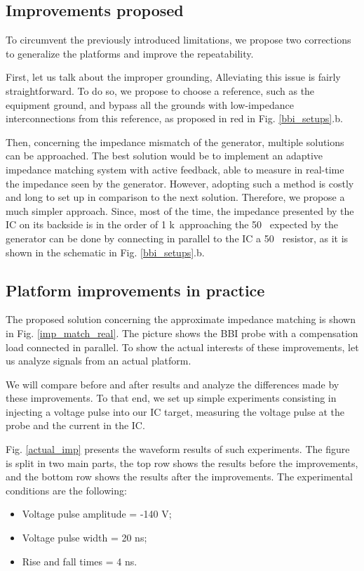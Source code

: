 	\subsection{Improvements proposed}
		To circumvent the previously introduced limitations, we propose two corrections to generalize the platforms and improve the repeatability.

		First, let us talk about the improper grounding,
		Alleviating this issue is fairly straightforward.
		To do so, we propose to choose a reference, such as the equipment ground, and bypass all the grounds with low-impedance interconnections from this reference, as proposed in red in Fig. \ref{bbi_setups}.b.

		Then, concerning the impedance mismatch of the generator, multiple solutions can be approached.
		The best solution would be to implement an adaptive impedance matching system with active feedback, able to measure in real-time the impedance seen by the generator.
		However, adopting such a method is costly and long to set up in comparison to the next solution.
		Therefore, we propose a much simpler approach.
		Since, most of the time, the impedance presented by the IC on its backside is in the order of 1 k\textOmega\, approaching the 50 \textOmega\ expected by the generator can be done by connecting in parallel to the IC a 50 \textOmega\ resistor, as it is shown in the schematic in Fig. \ref{bbi_setups}.b.

	\subsection{Platform improvements in practice}
		
		The proposed solution concerning the approximate impedance matching is shown in Fig. \ref{imp_match_real}.
		The picture shows the BBI probe with a compensation load connected in parallel.
		To show the actual interests of these improvements, let us analyze signals from an actual platform.

		We will compare before and after results and analyze the differences made by these improvements.
		To that end, we set up simple experiments consisting in injecting a voltage pulse into our IC target, measuring the voltage pulse at the probe and the current in the IC.
		
		Fig. \ref{actual_imp} presents the waveform results of such experiments.
		The figure is split in two main parts, the top row shows the results before the improvements, and the bottom row shows the results after the improvements.
		The experimental conditions are the following:
		\begin{itemize}
			\item Voltage pulse amplitude = -140 V;
			\item Voltage pulse width = 20 ns;
			\item Rise and fall times = 4 ns.
		\end{itemize}


